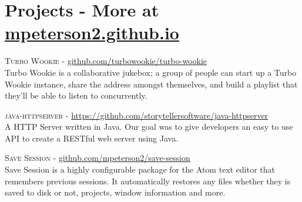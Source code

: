 \documentclass[letterpaper,10pt]{article}
\begin{document}
    \section{Projects - More at \href{http://mpeterson2.github.io}{mpeterson2.github.io}}
    
        \textsc{Turbo Wookie} -     \href{https://github.com/turbowookie/turbo-wookie}{github.com/turbowookie/turbo-wookie} \\
        Turbo Wookie is a collaborative jukebox; a group of people can start up a Turbo Wookie instance, share the address amongst themselves, and build a playlist that they'll be able to listen to concurrently.
        
        \textsc{java-httpserver} -  \href{https://github.com/storytellersoftware/java-httpserver}{https://github.com/storytellersoftware/java-httpserver} \\
        A HTTP Server written in Java. Our goal was to give developers an easy to use API to create a RESTful web server using Java.
        
        \textsc{Save Session} - \href{https://github.com/mpeterson2/save-session}{github.com/mpeterson2/save-session} \\
        Save Session is a highly configurable package for the Atom text editor that remembers previous sessions. It automatically restores any files whether they is saved to disk or not, projects, window information and more.
    
\end{document}

